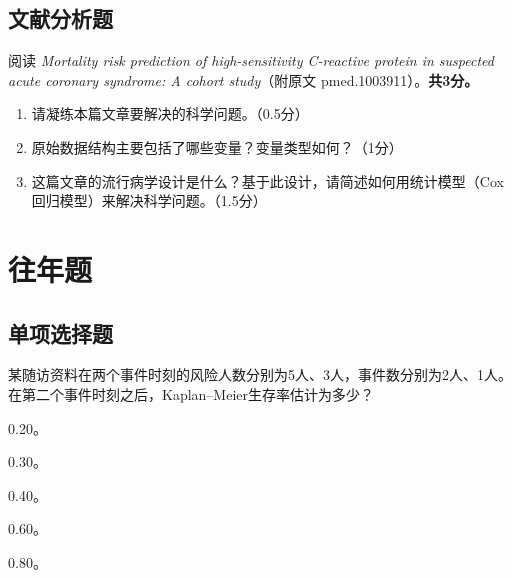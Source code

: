 \par\addvspace{8pt}\noindent\begin{minipage}{\linewidth}

\subsection{文献分析题}


阅读 \emph{Mortality risk prediction of high-sensitivity C-reactive protein in suspected acute coronary syndrome: A cohort study}（附原文 pmed.1003911）。\textbf{共3分。}

\begin{enumerate}
\def\labelenumi{\arabic{enumi}.}
\tightlist
\item
  请凝练本篇文章要解决的科学问题。（0.5分）
\item
  原始数据结构主要包括了哪些变量？变量类型如何？（1分）
\item
  这篇文章的流行病学设计是什么？基于此设计，请简述如何用统计模型（Cox回归模型）来解决科学问题。（1.5分）
\end{enumerate}



\end{minipage}\par\vspace{5pt}

\par\addvspace{8pt}\noindent\begin{minipage}{\linewidth}

\section{往年题}

\subsection{单项选择题}


某随访资料在两个事件时刻的风险人数分别为5人、3人，事件数分别为2人、1人。在第二个事件时刻之后，Kaplan--Meier生存率估计为多少？


\begin{choices}

\item 0.20。

\item 0.30。

\item 0.40。

\item 0.60。

\item 0.80。

\end{choices}

\end{minipage}\par\vspace{5pt}

